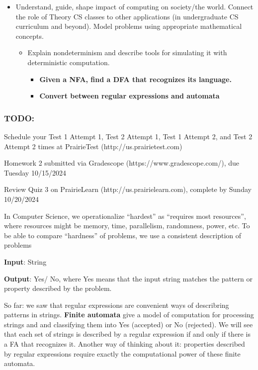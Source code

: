 \begin{itemize}
\item Understand, guide, shape impact of computing on society/the world. Connect the role of Theory CS classes to other applications (in undergraduate CS curriculum and beyond). Model problems using appropriate mathematical concepts.
 \begin{itemize}
     \item Explain nondeterminism and describe tools for simulating it with deterministic computation.
     \begin{itemize}
       \item {\bf Given a NFA, find a DFA that recognizes its language.}
       \item {\bf Convert between regular expressions and automata}
     \end{itemize}
 \end{itemize}

\end{itemize}

\vspace{-20pt}

\subsubsection*{TODO:}
\begin{list}{\itemsep-10pt}
   \item Schedule your Test 1 Attempt 1, Test 2 Attempt 1, Test 1 Attempt 2, and Test 2 Attempt 2 times 
   at PrairieTest (http://us.prairietest.com)
   \item Homework 2 submitted via Gradescope (https://www.gradescope.com/), due Tuesday 10/15/2024
   \item Review Quiz 3 on PrairieLearn (http://us.prairielearn.com), complete by Sunday 10/20/2024
\end{list}

\newpage

In Computer Science, we operationalize ``hardest'' as ``requires most resources'', where
resources might be memory, time, parallelism, randomness, power, etc.
To be able to compare ``hardness'' of problems, we use a consistent description of problems

{\bf Input}: String

{\bf Output}: Yes/ No, where Yes means that the input string matches the pattern or property described by the problem.

So far: we saw that regular expressions are convenient ways of describring patterns in strings.
{\bf Finite automata} give a model of computation for processing strings and and classifying them into Yes (accepted)
or No (rejected). We will see that each set of strings is described by a regular expression if and only 
if there is a FA that recognizes it.  Another way of thinking about it: properties described by regular
expressions require exactly the computational power of these finite automata.

